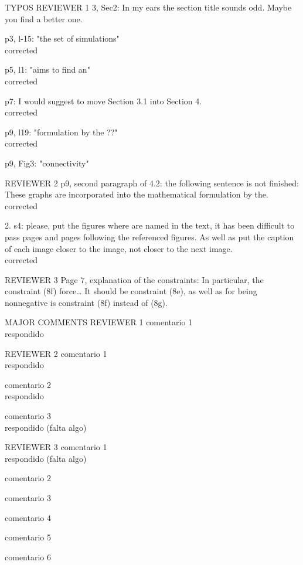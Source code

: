 TYPOS 
REVIEWER 1
3, Sec2: In my ears the section title sounds odd. Maybe you find a better one.

p3, l-15: "the set of simulations"
\\corrected

p5, l1: "aims to find an"
\\corrected

p7: I would suggest to move Section 3.1 into Section 4.
\\corrected

p9, l19: "formulation by the ??"
\\corrected

p9, Fig3: "connectivity"


REVIEWER 2
p9, second paragraph of 4.2: the following sentence is not finished: These graphs are
incorporated into the mathematical formulation by the.
\\corrected

2. s4: please, put the figures where are named in the text, it has been difficult to pass
pages and pages following the referenced figures. As well as put the caption of each
image closer to the image, not closer to the next image.
\\corrected


REVIEWER 3
Page 7, explanation of the constraints: In particular, the constraint (8f) force… It should be constraint (8e), as well as for being nonnegative is constraint (8f) instead of (8g).


MAJOR COMMENTS
REVIEWER 1
comentario 1
\\ respondido


REVIEWER 2
comentario 1
\\ respondido

comentario 2
\\ respondido

comentario 3
\\ respondido (falta algo)


REVIEWER 3
comentario 1
\\respondido (falta algo)

comentario 2

comentario 3

comentario 4

comentario 5

comentario 6